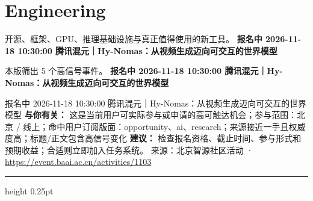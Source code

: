 \documentclass[10.5pt]{ctexart}
\begin{document}
\section*{Engineering}
{\color{ormuted} 开源、框架、GPU、推理基础设施与真正值得使用的新工具。}
\vspace{2mm}
{\LARGE\bfseries 报名中 2026-11-18 10:30:00 腾讯混元｜Hy-Nomas：从视频生成迈向可交互的世界模型}\par
\vspace{1mm}
{\color{ormuted} 本版筛出 5 个高信号事件。}
\vspace{3mm}
{\Large\bfseries 报名中 2026-11-18 10:30:00 腾讯混元｜Hy-Nomas：从视频生成迈向可交互的世界模型}\par
报名中 2026-11-18 10:30:00 腾讯混元｜Hy-Nomas：从视频生成迈向可交互的世界模型
\textbf{与你有关：} 这是当前用户可实际参与或申请的高可触达机会；参与范围：北京 / 线上；命中用户订阅版面：opportunity、ai、research；来源接近一手且权威度高；标题/正文包含高信号变化
\textbf{建议：} 检查报名资格、截止时间、参与形式和预期收益；合适则立即加入任务系统。
{\footnotesize\color{ormuted} 来源：北京智源社区活动 · \url{https://event.baai.ac.cn/activities/1103}}
\vspace{4mm}
\hrule height 0.25pt
\vspace{3mm}
\end{document}
